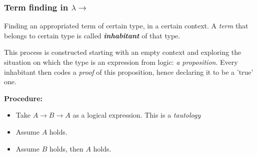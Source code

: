 \documentclass[12pt, a4paper]{article}
\begin{document}
\subsubsection{Term finding in \texorpdfstring{$\lambda\to$}{Lg}}
Finding an appropriated term of certain type, in a certain context. A \textit{term} that belongs to certain type is called \textbf{\textit{inhabitant}} of that type.

This process is constructed starting with an empty context and exploring the situation on which the type is an expression from logic: \textit{a proposition}. Every inhabitant then codes a \textit{proof}
of this proposition, hence declaring it to be a 'true' one.

\textbf{Procedure:}
\begin{itemize}
    \item Take $A \to B \to A$ as a logical expression. This is a \textit{tautology}
    \item Assume $A$ holds. 
    \item Assume $B$ holds, then $A$ holds.
\end{itemize}

\begin{flagderiv}
    \skipsteps*{\vdots}{}
    \skipsteps*{\vdots}{}
  \end{flagderiv}

  \begin{flagderiv}
    \skipsteps*{\vdots}{}
  \end{flagderiv}

  \begin{flagderiv}
  \end{flagderiv}
\end{document}
